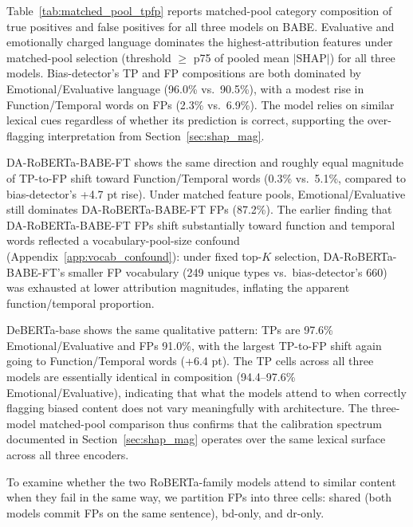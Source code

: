 \documentclass[11pt]{article}
\begin{document}
Table~\ref{tab:matched_pool_tpfp} reports matched-pool category 
composition of true positives and false positives for all three 
models on BABE. Evaluative and emotionally charged language dominates the 
highest-attribution features under matched-pool selection (threshold 
$\geq$ p75 of pooled mean $|$SHAP$|$) for all three models.
Bias-detector's TP and FP compositions are both 
dominated by Emotional/Evaluative language (96.0\% vs.\ 90.5\%), with 
a modest rise in Function/Temporal words on FPs (2.3\% vs.\ 6.9\%). 
The model relies on similar lexical cues regardless of whether its 
prediction is correct, supporting the over-flagging interpretation from 
Section~\ref{sec:shap_mag}.

DA-RoBERTa-BABE-FT shows the same direction and roughly equal magnitude 
of TP-to-FP shift toward Function/Temporal words (0.3\% vs.\ 5.1\%, 
compared to bias-detector's +4.7 pt rise). Under matched feature pools, 
Emotional/Evaluative still dominates DA-RoBERTa-BABE-FT FPs (87.2\%). 
The earlier finding that DA-RoBERTa-BABE-FT FPs shift substantially 
toward function and temporal words reflected a vocabulary-pool-size 
confound (Appendix~\ref{app:vocab_confound}): under fixed top-$K$ 
selection, DA-RoBERTa-BABE-FT's smaller FP vocabulary (249 unique 
types vs.\ bias-detector's 660) was exhausted at lower attribution 
magnitudes, inflating the apparent function/temporal proportion.

DeBERTa-base shows the same qualitative pattern: TPs are 97.6\% 
Emotional/Evaluative and FPs 91.0\%, with the largest TP-to-FP shift 
again going to Function/Temporal words (+6.4 pt). The TP cells across 
all three models are essentially identical in composition 
(94.4--97.6\% Emotional/Evaluative), indicating that what the models 
attend to when correctly flagging biased content does not vary 
meaningfully with architecture. The three-model matched-pool 
comparison thus confirms that the calibration spectrum documented in 
Section~\ref{sec:shap_mag} operates over the same lexical surface 
across all three encoders.

To examine whether the two RoBERTa-family models attend to similar 
content when they fail in the same way, we partition FPs into three 
cells: shared (both models commit FPs on the same sentence), bd-only, 
and dr-only.
\end{document}
